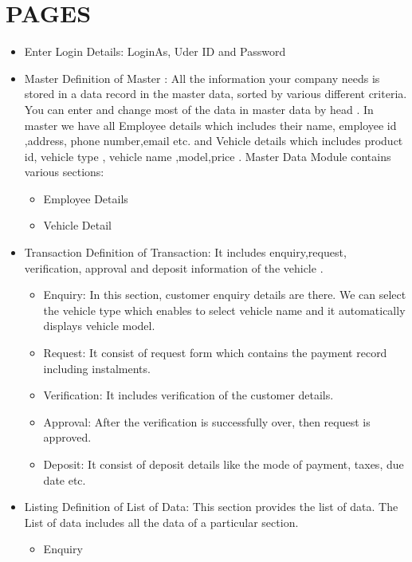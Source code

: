 
\section{PAGES}  
\begin{itemize}
\item Enter Login Details: LoginAs, Uder ID and Password
\item Master \newline
Definition of Master : All the information your company needs  is stored in a data record in the master data, sorted by various different criteria. You can enter and change most of the data in master data by head . In master  we have all Employee  details which includes their name, employee id ,address, phone number,email etc. and   Vehicle details which includes product id, vehicle type , vehicle name ,model,price .
\newline
Master Data Module contains various sections:	
\begin{itemize}
\item Employee Details
\item Vehicle Detail
\end{itemize}
\item Transaction\newline
Definition of Transaction: It includes enquiry,request, verification, approval and deposit information of the vehicle .\newline
\begin{itemize}
\item Enquiry:  In this section, customer enquiry details are there. We can select the vehicle type which enables to select vehicle name and it automatically displays vehicle model.
\item Request: It consist of request form which contains  the payment record including instalments.
\item Verification: It includes verification of the customer details.
\item Approval: After the verification is successfully over, then request is approved.
\item Deposit: It consist of deposit details like the mode of payment, taxes, due date etc.
\end{itemize}
\item Listing \newline
Definition of List of Data: This section provides the list of data. The List of data includes all the data of a particular section.
\begin{itemize}
\item Enquiry

\end{itemize}
\end{itemize}
